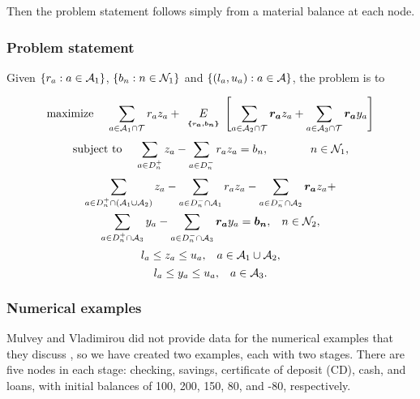 Then the problem statement follows simply from a material balance at each node.


\subsubsection{Problem statement}
Given $\{ r_a: a \in {\cal A}_1\}$, $\{ b_n : n \in {\cal N}_1\}$ and $\{(l_a,u_a):a \in {\cal A}\}$, the problem is to

\begin{equation*}
\mbox{maximize }\hspace{3mm}\sum_{a\in {\cal A}_1 \cap {\cal T}} r_a z_a + \expect[\{r_a,b_n\}]{\left[\sum_{a\in {\cal A}_2 \cap {\cal T}} \rand{r_a} z_a + \sum_{a\in {\cal A}_3 \cap {\cal T}} \rand{r_a} y_a\right]} 
\end{equation*}
\begin{equation*}
\mbox{subject to }\hspace{3mm} \sum_{a\in D_n^+} z_a - \sum_{a\in D_n^-} r_a z_a = b_n, \hspace{13mm} n\in {\cal N}_1, 
\end{equation*}
\begin{multline*}
\sum_{a\in D_n^+ \cap( {\cal A}_1\cup {\cal A}_2)} z_a - \sum_{a\in D_n^- \cap {\cal A}_1} r_a z_a - \sum_{a\in D_n^- \cap {\cal A}_2} \mathbf{\boldsymbol{r_a}} z_a + \\
\sum_{a\in D_n^+ \cap {\cal A}_3} y_a - \sum_{a\in D_n^- \cap {\cal A}_3} \mathbf{\boldsymbol{r_a}} y_a = \mathbf{\boldsymbol{b_n}}, \hspace{3mm} n\in {\cal N}_2,
\end{multline*}
\begin{equation*}
l_a \leq z_a \leq u_a, \hspace{3mm} a\in {\cal A}_1 \cup {\cal A}_2,
\end{equation*}
\begin{equation*}
l_a \leq y_a \leq u_a, \hspace{3mm} a\in {\cal A}_3.
\end{equation*}

\subsubsection{Numerical examples}
Mulvey and Vladimirou \cite{mulvey91} did not provide data for the numerical examples that they discuss \cite{mulveynote99}, so we have created two examples, each with two stages.  There are five nodes in each stage:  checking, savings, certificate of deposit (CD), cash, and loans, with initial balances of 100, 200, 150, 80, and -80, respectively. 

